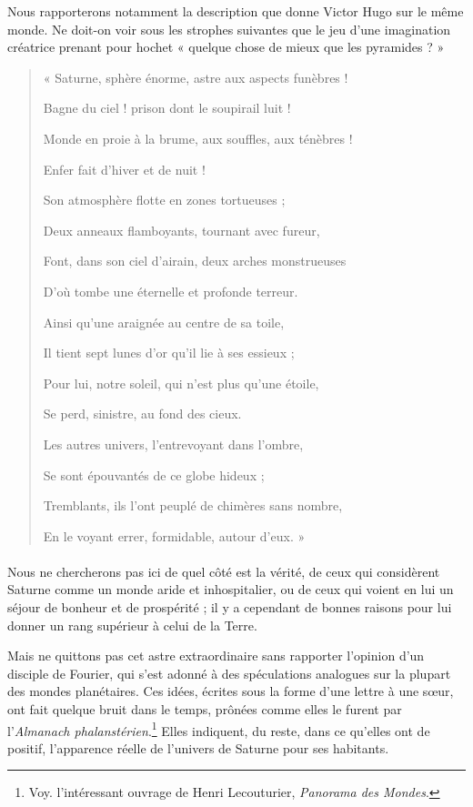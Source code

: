 \documentclass[a4paper, 11pt, oneside]{article}
\begin{document}
Nous rapporterons notamment la description que donne Victor Hugo sur le même monde. Ne doit-on voir sous les strophes suivantes que le jeu d'une imagination créatrice prenant pour hochet « quelque chose de mieux que les pyramides ? »
\begin{quotation}
« Saturne, sphère énorme, astre aux aspects funèbres !

Bagne du ciel ! prison dont le soupirail luit !

Monde en proie à la brume, aux souffles, aux ténèbres !

\hspace*{5mm}Enfer fait d'hiver et de nuit !

\bigskip

Son atmosphère flotte en zones tortueuses ;

Deux anneaux flamboyants, tournant avec fureur,

Font, dans son ciel d'airain, deux arches monstrueuses

D'où tombe une éternelle et profonde terreur.

\bigskip

Ainsi qu'une araignée au centre de sa toile,

Il tient sept lunes d'or qu'il lie à ses essieux ;

Pour lui, notre soleil, qui n'est plus qu'une étoile,

\hspace*{5mm}Se perd, sinistre, au fond des cieux.

\bigskip

Les autres univers, l'entrevoyant dans l'ombre,

Se sont épouvantés de ce globe hideux ;

Tremblants, ils l'ont peuplé de chimères sans nombre,

En le voyant errer, formidable, autour d'eux. »
\end{quotation}
\paragraph{}
Nous ne chercherons pas ici de quel côté est la vérité, de ceux qui considèrent Saturne comme un monde aride et inhospitalier, ou de ceux qui voient en lui un séjour de bonheur et de prospérité ; il y a cependant de bonnes raisons pour lui donner un rang supérieur à celui de la Terre.

Mais ne quittons pas cet astre extraordinaire sans rapporter l'opinion d'un disciple de Fourier, qui s'est adonné à des spéculations analogues sur la plupart des mondes planétaires. Ces idées, écrites sous la forme d'une lettre à une sœur, ont fait quelque bruit dans le temps, prônées comme elles le furent par l'\emph{Almanach phalanstérien}.\footnote{Voy. l'intéressant ouvrage de Henri Lecouturier, \emph{Panorama des Mondes}.} Elles indiquent, du reste, dans ce qu'elles ont de positif, l'apparence réelle de l'univers de Saturne pour ses habitants.
\end{document}
